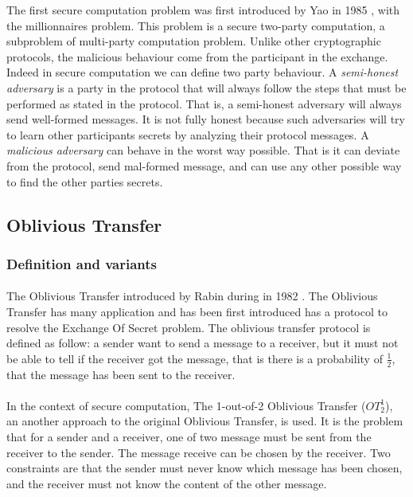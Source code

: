 \documentclass[11pt,a4paper]{article}
\begin{document}
The first secure computation problem was first introduced by
Yao in 1985 \cite{yao_protocols_1982}, with the millionnaires problem.
This problem is a secure two-party computation, a subproblem
of multi-party computation problem. Unlike other cryptographic
protocols, the malicious behaviour come from the
participant in the exchange. Indeed in secure computation
we can define two party behaviour. A \textit{semi-honest adversary}
is a party in the protocol that will always follow the steps
that must be performed as stated in the protocol. That is, a semi-honest
adversary will always send well-formed messages. It is not
fully honest because such adversaries will try to learn other
participants secrets by analyzing their protocol messages.
A \textit{malicious adversary} can behave in the worst way possible.
That is it can deviate from the protocol, send mal-formed message,
and can use any other possible way to find the other parties secrets.


\subsection{Oblivious Transfer}

\subsubsection{Definition and variants}

\paragraph{}


The Oblivious Transfer introduced by Rabin during
in 1982 \cite{rabin_how_nodate}. The Oblivious Transfer has many application
and has been first introduced has a protocol to resolve the Exchange Of
Secret problem.
The oblivious transfer protocol is defined as follow:
a sender want to send a message to a receiver, but it
must not be able to tell if the receiver got the message, that
is there is a probability of $\frac{1}{2}$, that the message
has been sent to the receiver.

\paragraph{}


In the context of secure computation,
The 1-out-of-2 Oblivious Transfer ($OT^1_2$),
an another approach to the original Oblivious Transfer, is used.
It is the problem
that for a sender and a receiver, one of two message must be sent
from the receiver to the sender. The message receive can be chosen
by the receiver. Two constraints are that the sender must never know
which message has been chosen, and the receiver must not know
the content of the other message.
\end{document}
